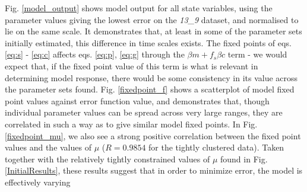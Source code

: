 \documentclass[10pt,journal]{./IEEE_latex_class/IEEEtran}
\begin{document}
Fig. \ref{model_output} shows model output for all state variables, using the parameter values giving the lowest error on the \textit{13\_9} dataset, and normalised to lie on the same scale. It demonstrates that, at least in some of the parameter sets initially estimated, this difference in time scales exists. The fixed points of eqs. \ref{eq:s} - \ref{eq:c} affects eqs.  \ref{eq:p}, \ref{eq:g} through the $\beta m +f_{s}\beta c$ term - we would expect that, if the fixed point value of this term is what is relevant in determining model response, there would be some consistency in its value across the parameter sets found. Fig. \ref{fixedpoint_f} shows a scatterplot of model fixed point values against error function value, and demonstrates that, though individual parameter values can be spread across very large ranges, they are correlated in such a way as to give similar model fixed points. In Fig. \ref{fixedpoint_mu}, we also see a strong positive correlation between the fixed point values and the values of $\mu$ ($R = 0.9854$ for the tightly clustered data). Taken together with the relatively tightly constrained values of $\mu$ found in Fig. \ref{InitialResults}, these results suggest that in order to minimize error, the model is effectively varying  
 

 
\end{document}
